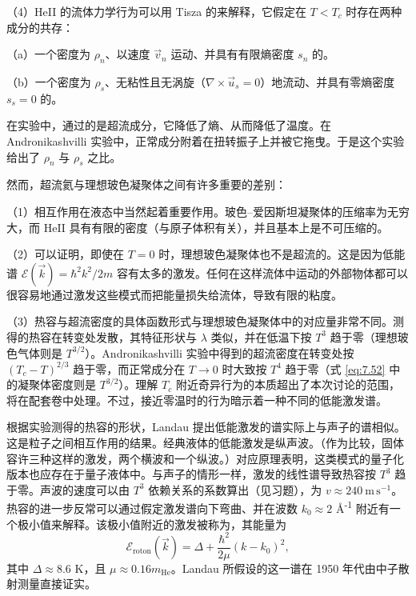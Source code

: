 （4）HeII 的流体力学行为可以用 Tisza 的来解释，它假定在 $T<T_c$ 时存在两种成分的共存：

（a）一个密度为 $\rho_n$、以速度 $\vec v_n$ 运动、并具有有限熵密度 $s_n$ 的。

（b）一个密度为 $\rho_s$、无粘性且无涡旋（$\nabla\times\vec u_s=0$）地流动、并具有零熵密度 $s_s=0$ 的。

在实验中，通过的是超流成分，它降低了熵、从而降低了温度。在 Andronikashvilli 实验中，正常成分附着在扭转振子上并被它拖曳。于是这个实验给出了 $\rho_n$ 与 $\rho_s$ 之比。

然而，超流氦与理想玻色凝聚体之间有许多重要的差别：


（1）相互作用在液态中当然起着重要作用。玻色--爱因斯坦凝聚体的压缩率为无穷大，而 HeII 具有有限的密度（与原子体积有关），并且基本上是不可压缩的。

（2）可以证明，即使在 $T=0$ 时，理想玻色凝聚体也不是超流的。这是因为低能谱 $\mathcal E(\vec k)=\hbar^2k^2/2m$ 容有太多的激发。任何在这样流体中运动的外部物体都可以很容易地通过激发这些模式而把能量损失给流体，导致有限的粘度。

（3）热容与超流密度的具体函数形式与理想玻色凝聚体中的对应量非常不同。测得的热容在转变处发散，其特征形状与 $\lambda$ 类似，并在低温下按 $T^3$ 趋于零（理想玻色气体则是 $T^{3/2}$）。Andronikashvilli 实验中得到的超流密度在转变处按 $(T_c-T)^{2/3}$ 趋于零，而正常成分在 $T\to0$ 时大致按 $T^4$ 趋于零（式 \eqref{eq:7.52} 中的凝聚体密度则是 $T^{3/2}$）。理解 $T_c$ 附近奇异行为的本质超出了本次讨论的范围，将在配套卷中处理。不过，接近零温时的行为暗示着一种不同的低能激发谱。

根据实验测得的热容的形状，Landau 提出低能激发的谱实际上与声子的谱相似。这是粒子之间相互作用的结果。经典液体的低能激发是纵声波。（作为比较，固体容许三种这样的激发，两个横波和一个纵波。）对应原理表明，这类模式的量子化版本也应存在于量子液体中。与声子的情形一样，激发的线性谱导致热容按 $T^3$ 趋于零。声波的速度可以由 $T^3$ 依赖关系的系数算出（见习题），为 $v\approx240\ \text{m}\,\text{s}^{-1}$。热容的进一步反常可以通过假定激发谱向下弯曲、并在波数 $k_0\approx2$ \AA\textsuperscript{-1} 附近有一个极小值来解释。该极小值附近的激发被称为，其能量为
\begin{equation}\label{eq:7.68}
\mathcal E_{\text{roton}}(\vec k)=\Delta+\frac{\hbar^2}{2\mu}(k-k_0)^2,
\end{equation}
其中 $\Delta\approx8.6$ K，且 $\mu\approx0.16m_{\text{He}}$。Landau 所假设的这一谱在 1950 年代由中子散射测量直接证实。

